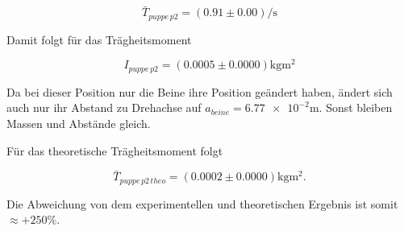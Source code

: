 \begin{equation*}
\bar{T}_{puppe\, p2}=\left(\num{0.91}\pm\num{0.00}\right) \si{\per\second}
\end{equation*}

Damit folgt für das Trägheitsmoment

\begin{equation}
\label{eq:traeg_puppe_p2}
I_{puppe \,p2}= \left(\num{0.0005}\pm\num{0.0000}\right)\si{\kilogram\meter\squared}
\end{equation}

Da bei dieser Position nur die Beine ihre Position geändert haben, ändert sich auch nur ihr Abstand zu Drehachse auf $a_{beine}=\num{6.77e-2}\si{\meter}$.
Sonst bleiben Massen und Abstände gleich.

Für das theoretische Trägheitsmoment folgt

\begin{equation*}
\bar{T}_{puppe\, p2\,theo}=\left(\num{0.0002}\pm\num{0.0000}\right) \si{\kilogram\meter\squared}.
\end{equation*}

Die Abweichung von dem experimentellen und theoretischen Ergebnis ist 
somit $\approx +250 \%$.


